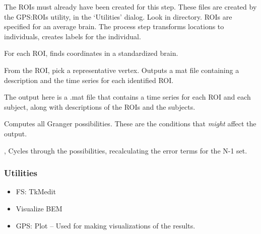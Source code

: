 \documentclass[11pt]{article}
\begin{document}
\begin{itemize}

 The ROIs must already have been created for this step.
These files are created by the GPS:ROIs
  utility, in the `Utilities' dialog.  Look in
   directory.   ROIs are specified for an
  average brain.  The process step transforms locations to
  individuals, creates labels for the individual.

%
{} For
each ROI, finds coordinates in a
  standardized brain.  %

%
{}
From the ROI,
pick a representative vertex.  Outputs a mat file containing a
description and the time series for each identified ROI.

%
{} The output here is a .mat file that
contains a time series for each ROI and each subject, along with
descriptions of the ROIs and the subjects.

%
{} Computes all Granger
possibilities.  These are the conditions that \emph{might} affect the output.

%
{,
  }  Cycles through the
possibilities, recalculating the error terms for the N-1 set.

\end{itemize}


\subsubsection{Utilities}

\begin{itemize}

\item FS: TkMedit

\item Visualize BEM



%
{}

\item GPS: Plot -- Used for making visualizations of the results.

\end{itemize}
\end{document}
